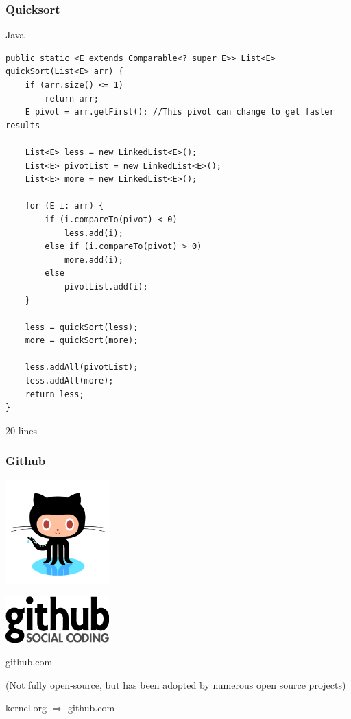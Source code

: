 \documentclass{beamer}
\begin{document}
\begin{frame}[fragile]
  \frametitle{Quicksort}
  \begin{block}{Java}
\fontsize{6pt}{6pt}\selectfont
\begin{verbatim}
public static <E extends Comparable<? super E>> List<E> quickSort(List<E> arr) {
    if (arr.size() <= 1)
        return arr;
    E pivot = arr.getFirst(); //This pivot can change to get faster results
 
    List<E> less = new LinkedList<E>();
    List<E> pivotList = new LinkedList<E>();
    List<E> more = new LinkedList<E>();
 
    for (E i: arr) {
        if (i.compareTo(pivot) < 0)
            less.add(i);
        else if (i.compareTo(pivot) > 0)
            more.add(i);
        else
            pivotList.add(i);
    }
 
    less = quickSort(less);
    more = quickSort(more);
 
    less.addAll(pivotList);
    less.addAll(more);
    return less;
}
\end{verbatim}
  \end{block}

  20 lines
\end{frame}

\begin{frame}
  \frametitle{Github}
  \begin{center}
    \includegraphics[width=0.3\textwidth]{../img/octocat}

    \includegraphics[width=0.3\textwidth]{../img/github-logo}

    github.com

    \vspace{1em}

    \begin{footnotesize}
      (Not fully open-source, but has been adopted by numerous open
      source projects)

      kernel.org $\Rightarrow$ github.com
    \end{footnotesize}
  \end{center}
\end{frame}
\end{document}

